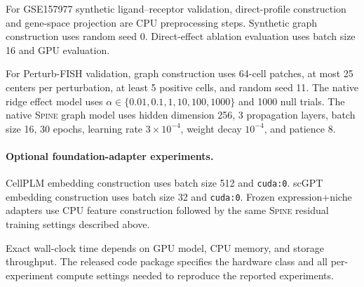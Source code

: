 \documentclass[sigconf,anonymous,review]{acmart}
\newcommand{\methodname}{\textsc{Spine}\xspace}
\begin{document}
For GSE157977 synthetic ligand--receptor validation, direct-profile construction and gene-space projection are CPU preprocessing steps. Synthetic graph construction uses random seed 0. Direct-effect ablation evaluation uses batch size 16 and GPU evaluation.

For Perturb-FISH validation, graph construction uses 64-cell patches, at most 25 centers per perturbation, at least 5 positive cells, and random seed 11. The native ridge effect model uses $\alpha\in\{0.01,0.1,1,10,100,1000\}$ and 1000 null trials. The native \methodname{} graph model uses hidden dimension 256, 3 propagation layers, batch size 16, 30 epochs, learning rate $3\times10^{-4}$, weight decay $10^{-4}$, and patience 8.

\paragraph{Optional foundation-adapter experiments.}
CellPLM embedding construction uses batch size 512 and \texttt{cuda:0}. scGPT embedding construction uses batch size 32 and \texttt{cuda:0}. Frozen expression+niche adapters use CPU feature construction followed by the same \methodname{} residual training settings described above.

Exact wall-clock time depends on GPU model, CPU memory, and storage throughput. The released code package specifies the hardware class and all per-experiment compute settings needed to reproduce the reported experiments.
\end{document}
